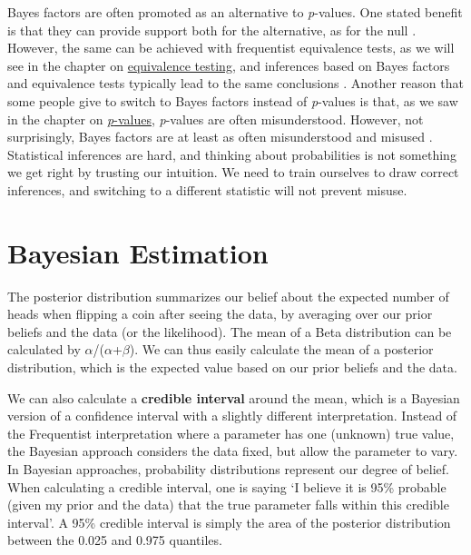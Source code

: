 \documentclass[
  oneside]{krantz}
\begin{document}
Bayes factors are often promoted as an alternative to \emph{p}-values. One stated benefit is that they can provide support both for the alternative, as for the null \citep{dienes_using_2014}. However, the same can be achieved with frequentist equivalence tests, as we will see in the chapter on \protect\hyperlink{equivalencetest}{equivalence testing}, and inferences based on Bayes factors and equivalence tests typically lead to the same conclusions \citep{lakens_improving_2020}. Another reason that some people give to switch to Bayes factors instead of \emph{p}-values is that, as we saw in the chapter on \protect\hyperlink{misconceptions}{\emph{p}-values}, \emph{p}-values are often misunderstood. However, not surprisingly, Bayes factors are at least as often misunderstood and misused \citep{wong_potential_2021}. Statistical inferences are hard, and thinking about probabilities is not something we get right by trusting our intuition. We need to train ourselves to draw correct inferences, and switching to a different statistic will not prevent misuse.

\hypertarget{bayesest}{%
\section{Bayesian Estimation}\label{bayesest}}

The posterior distribution summarizes our belief about the expected number of heads when flipping a coin after seeing the data, by averaging over our prior beliefs and the data (or the likelihood). The mean of a Beta distribution can be calculated by \(\alpha\)/(\(\alpha\)+\(\beta\)). We can thus easily calculate the mean of a posterior distribution, which is the expected value based on our prior beliefs and the data.

We can also calculate a \textbf{credible interval} around the mean, which is a Bayesian version of a confidence interval with a slightly different interpretation. Instead of the Frequentist interpretation where a parameter has one (unknown) true value, the Bayesian approach considers the data fixed, but allow the parameter to vary. In Bayesian approaches, probability distributions represent our degree of belief. When calculating a credible interval, one is saying `I believe it is 95\% probable (given my prior and the data) that the true parameter falls within this credible interval'. A 95\% credible interval is simply the area of the posterior distribution between the 0.025 and 0.975 quantiles.
\end{document}
